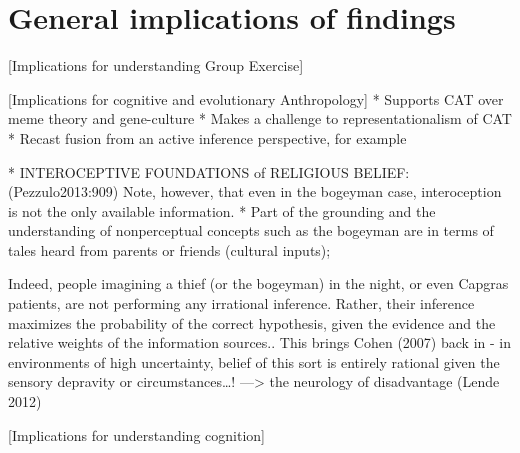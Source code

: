 










\section{General implications of findings}



  [Implications for understanding Group Exercise]


  [Implications for cognitive and evolutionary Anthropology]
        * Supports CAT over meme theory and gene-culture
            * Makes a challenge to representationalism of CAT
        * Recast fusion from an active inference perspective, for example


        * INTEROCEPTIVE FOUNDATIONS of RELIGIOUS BELIEF: (Pezzulo2013:909)
        Note, however, that even in the bogeyman case, interoception is not the only available information.
            * Part of the grounding and the understanding of nonperceptual concepts such as the bogeyman are in terms of tales heard from parents or friends (cultural inputs);

            Indeed, people imagining a thief (or the bogeyman) in the night, or even Capgras patients, are not performing any irrational inference. Rather, their inference maximizes the probability of the correct hypothesis, given the evidence and the relative weights of the information sources..
      This brings Cohen (2007) back in - in environments of high uncertainty, belief of this sort is entirely rational given the sensory depravity or circumstances…!
  —> the neurology of disadvantage (Lende 2012)


  [Implications for understanding cognition]


